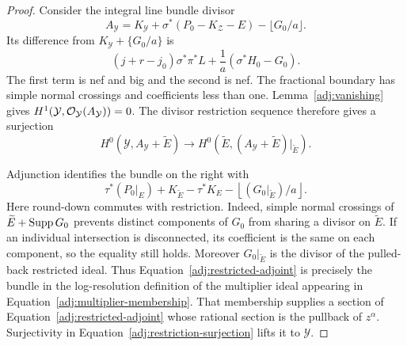 \begin{proof}
Consider the integral line bundle divisor
\[
 A_{\mathcal Y}=K_{\mathcal Y}
       +\sigma^*(P_0-K_{\mathcal Z}-E)-\lfloor G_0/a\rfloor.
\]
Its difference from $K_{\mathcal Y}+\{G_0/a\}$ is
\begin{equation}\label{adj:resolution-positivity}
 (j+r-j_0)\sigma^*\pi^*L
          +\frac1a(\sigma^*H_0-G_0).
\end{equation}
The first term is nef and big and the second is nef.  The fractional
boundary has simple normal crossings and coefficients less than
one.  Lemma~\ref{adj:vanishing} gives
$H^1(\mathcal Y,\mathcal O_{\mathcal Y}(A_{\mathcal Y}))=0$.
The divisor restriction sequence therefore gives a surjection
\begin{equation}\label{adj:restriction-surjection}
 H^0(\mathcal Y,A_{\mathcal Y}+\widetilde E)
    \longrightarrow
 H^0(\widetilde E,(A_{\mathcal Y}+\widetilde E)|_{\widetilde E}).
\end{equation}

Adjunction identifies the bundle on the right with
\begin{equation}\label{adj:restricted-adjoint}
 \tau^*(P_0|_E)+K_{\widetilde E}-\tau^*K_E
               -\left\lfloor (G_0|_{\widetilde E})/a\right\rfloor.
\end{equation}
Here round-down commutes with restriction.  Indeed, simple normal
crossings of $\widetilde E+\operatorname{Supp} G_0$ prevents distinct components
of $G_0$ from sharing a divisor on $\widetilde E$.  If an individual
intersection is disconnected, its coefficient is the same on each
component, so the equality still holds.  Moreover
$G_0|_{\widetilde E}$ is the divisor of the pulled-back restricted
ideal.  Thus Equation~\eqref{adj:restricted-adjoint} is precisely
the bundle in the log-resolution definition of the multiplier ideal
appearing in Equation~\eqref{adj:multiplier-membership}.
That membership supplies a section of
Equation~\eqref{adj:restricted-adjoint} whose rational section is
the pullback of $z^\alpha$.  Surjectivity in
Equation~\eqref{adj:restriction-surjection} lifts it to
$\mathcal Y$.


\end{proof}
